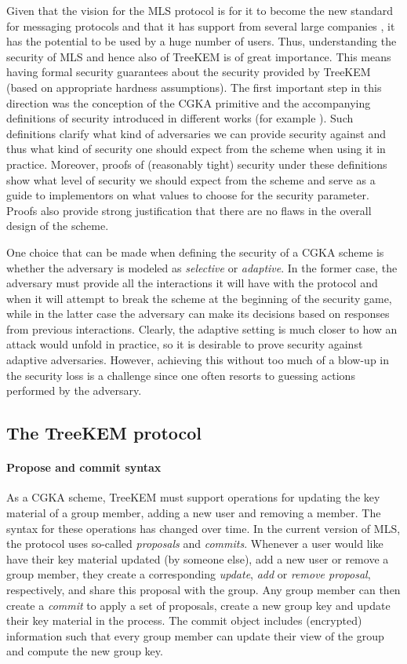 Given that the vision for the MLS protocol is for it to become the new standard for messaging protocols and that it has support from several large companies \cite{google-mls,mls-support}, it has the potential to be used by a huge number of users. Thus, understanding the security of MLS and hence also of TreeKEM is of great importance. This means having formal security guarantees about the security provided by TreeKEM (based on appropriate hardness assumptions). The first important step in this direction was the conception of the CGKA primitive and the accompanying definitions of security introduced in different works (for example \cite{rtreekem,ttkem}). Such definitions clarify what kind of adversaries we can provide security against and thus what kind of security one should expect from the scheme when using it in practice. Moreover, proofs of (reasonably tight) security under these definitions show what level of security we should expect from the scheme and serve as a guide to implementors on what values to choose for the security parameter. Proofs also provide strong justification that there are no flaws in the overall design of the scheme.

One choice that can be made when defining the security of a CGKA scheme is whether the adversary is modeled as \emph{selective} or \emph{adaptive}. In the former case, the adversary must provide all the interactions it will have with the protocol and when it will attempt to break the scheme at the beginning of the security game, while in the latter case the adversary can make its decisions based on responses from previous interactions. Clearly, the adaptive setting is much closer to how an attack would unfold in practice, so it is desirable to prove security against adaptive adversaries. However, achieving this without too much of a blow-up in the security loss is a challenge since one often resorts to guessing actions performed by the adversary.

\subsection{The TreeKEM protocol} \label{sec:treekem-overview}

\paragraph{Propose and commit syntax}

As a CGKA scheme, TreeKEM must support operations for updating the key material of a group member, adding a new user and removing a member. The syntax for these operations has changed over time. In the current version of MLS, the protocol uses so-called \emph{proposals} and \emph{commits}. Whenever a user would like have their key material updated (by someone else), add a new user or remove a group member, they create a corresponding \emph{update}, \emph{add} or \emph{remove proposal}, respectively, and share this proposal with the group. Any group member can then create a \emph{commit} to apply a set of proposals, create a new group key and update their key material in the process. The commit object includes (encrypted) information such that every group member can update their view of the group and compute the new group key.

